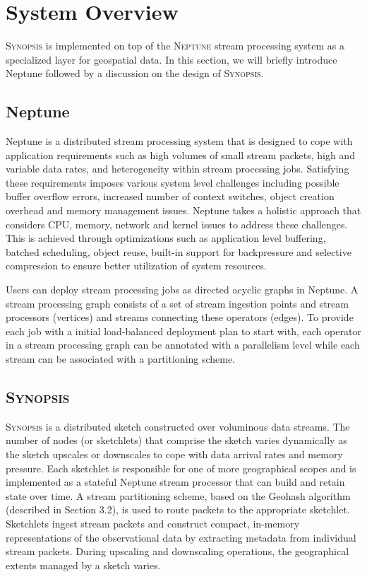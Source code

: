 \section{System Overview}
\label{sec:system}
\textsc{Synopsis} is implemented on top of the \textsc{Neptune} stream processing system \cite{buddhika2016neptune} as a specialized layer for geospatial data.
In this section, we will briefly introduce Neptune followed by a discussion on the design of \textsc{Synopsis}.

\subsection{Neptune}
Neptune is a distributed stream processing system that is designed to cope with application requirements such as high volumes of small stream packets, high and variable data rates, and heterogeneity within stream processing jobs.
Satisfying these requirements imposes various system level challenges including possible buffer overflow errors, increased number of context switches, object creation overhead and memory management issues.
Neptune takes a holistic approach that considers CPU, memory, network and kernel issues to address these challenges.
This is achieved through optimizations such as application level buffering, batched scheduling, object reuse, built-in support for backpressure and selective compression to ensure better utilization of system resources.

Users can deploy stream processing jobs as directed acyclic graphs in Neptune.
A stream processing graph consists of a set of stream ingestion points and stream processors (vertices) and streams connecting these operators (edges).
To provide each job with a initial load-balanced deployment plan to start with, each operator in a stream processing graph can be annotated with a parallelism level while each stream can be associated with a partitioning scheme.

\subsection{\textsc{Synopsis}}
\textsc{Synopsis} is a distributed sketch constructed over voluminous data streams.
The number of nodes (or sketchlets) that comprise the sketch varies dynamically as the sketch upscales or downscales to cope with data arrival rates and memory pressure.
Each sketchlet is responsible for one of more geographical scopes and is implemented as a stateful Neptune stream processor that can build and retain state over time.
A stream partitioning scheme, based on the Geohash algorithm (described in Section 3.2), is used to route packets to the appropriate sketchlet.
Sketchlets ingest stream packets and construct compact, in-memory representations of the observational data by extracting metadata from individual stream packets.
During upscaling and downscaling operations, the geographical extents managed by a sketch varies.

